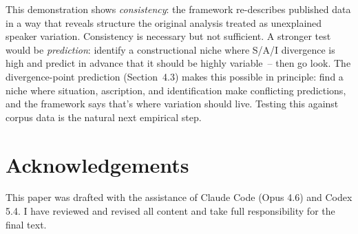 \documentclass[11pt,letterpaper]{article}
\begin{document}
This demonstration shows \emph{consistency}: the framework re-describes published data in a way that reveals structure the original analysis treated as unexplained speaker variation. Consistency is necessary but not sufficient. A stronger test would be \emph{prediction}: identify a constructional niche where S/A/I divergence is high and predict in advance that it should be highly variable~-- then go look. The divergence-point prediction (Section~4.3) makes this possible in principle: find a niche where situation, ascription, and identification make conflicting predictions, and the framework says that's where variation should live. Testing this against corpus data is the natural next empirical step.


\section*{Acknowledgements}

This paper was drafted with the assistance of Claude Code (Opus 4.6) and Codex 5.4. I have reviewed and revised all content and take full responsibility for the final text.

\newpage
\printbibliography
\end{document}
